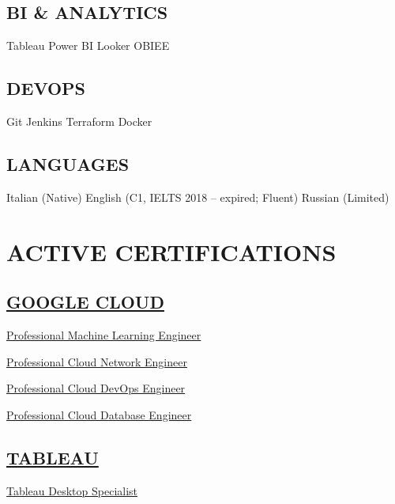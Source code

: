 \documentclass[]{deedy-resume-cv}
\begin{document}
\begin{minipage}[t]{0.35\textwidth}
\sectionsep

\subsection{BI \& ANALYTICS}
Tableau \textbullet{} Power BI \textbullet{} Looker \textbullet{} OBIEE

\sectionsep

\subsection{DEVOPS}
Git \textbullet{} Jenkins \textbullet{} Terraform \textbullet{} Docker

\sectionsep

\subsection{LANGUAGES}
Italian (Native) \textbullet{} English (C1, IELTS 2018 – expired; Fluent) \textbullet{} Russian (Limited)

\section{ACTIVE CERTIFICATIONS}

\subsection{\href{https://cloud.google.com/}{GOOGLE CLOUD}}
\href{https://www.credly.com/badges/b55bbd99-441d-410e-ac38-ca5e7834b8ef/public_url}{Professional Machine Learning Engineer}

\href{https://www.credly.com/badges/03d9c9f3-04df-4e9b-ba2f-49a3169535cd/public_url}{Professional Cloud Network Engineer}

\href{https://www.credly.com/badges/c6d15809-9a56-48a9-b1e7-3864cbd76ed2/public_url}{Professional Cloud DevOps Engineer}

\href{https://www.credly.com/badges/8f5c5580-3ce9-47b7-9a74-e4bfb8c2cdb8/public_url}{Professional Cloud Database Engineer}

\sectionsep

\subsection{\href{https://www.tableau.com/}{TABLEAU}}
\href{https://www.credly.com/badges/d8a0b29c-ecb0-4f59-b6df-7b3a871f766e}{Tableau Desktop Specialist}


\end{minipage}
\end{document}
